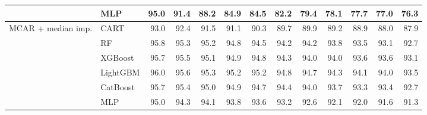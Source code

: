 \begin{table}[p]
\begin{tabular}{@{}llrrrrrrrrrrr@{}}
 & MLP & 95.0 & 91.4 & 88.2 & 84.9 & 84.5 & 82.2 & 79.4 & 78.1 & 77.7 & 77.0 & 76.3 \\
\midrule
MCAR + median imp. & CART & 93.0 & 92.4 & 91.5 & 91.1 & 90.3 & 89.7 & 89.9 & 89.2 & 88.9 & 88.0 & 87.9 \\
 & RF & 95.8 & 95.3 & 95.2 & 94.8 & 94.5 & 94.2 & 94.2 & 93.8 & 93.5 & 93.1 & 92.7 \\
 & XGBoost & 95.7 & 95.5 & 95.1 & 94.9 & 94.8 & 94.3 & 94.0 & 94.0 & 93.6 & 93.6 & 93.1 \\
 & LightGBM & 96.0 & 95.6 & 95.3 & 95.2 & 95.2 & 94.8 & 94.7 & 94.3 & 94.1 & 94.0 & 93.5 \\
 & CatBoost & 95.7 & 95.4 & 95.0 & 94.9 & 94.7 & 94.4 & 94.0 & 93.7 & 93.3 & 93.4 & 92.7 \\
 & MLP & 95.0 & 94.3 & 94.1 & 93.8 & 93.6 & 93.2 & 92.6 & 92.1 & 92.0 & 91.6 & 91.3 \\
\bottomrule
\end{tabular}
\end{table}


